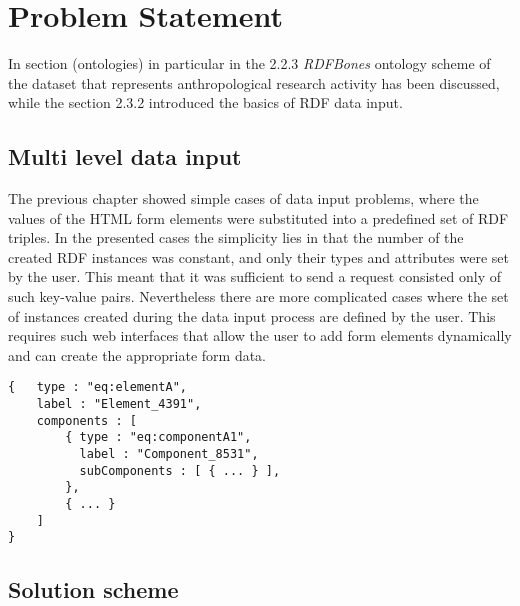 \chapter{Problem Statement}


In section (ontologies) in particular in the 2.2.3 \textit{RDFBones} ontology scheme of the dataset that represents anthropological research activity has been discussed, while the section 2.3.2 introduced the basics of RDF data input. 


\section{Multi level data input}


The previous chapter showed simple cases of data input problems, where the values of the HTML form elements were substituted into a predefined set of RDF triples. In the presented cases the simplicity lies in that the number of the created RDF instances was constant, and only their types and attributes were set by the user. This meant that it was sufficient to send a request consisted only of such key-value pairs. Nevertheless there are more complicated cases where the set of instances created during the data input process are defined by the user. This requires such web interfaces that allow the user to add form elements dynamically and can create the appropriate form data.









\begin{lstlisting}[basicstyle=\footnotesize, frame=single, caption={Multi level form data in JSON}, label=multiData, captionpos=b, belowskip=1em, aboveskip=2em]
{	type : "eq:elementA",
	label : "Element_4391",
	components : [
		{ type : "eq:componentA1",
		  label : "Component_8531",	
		  subComponents : [ { ... } ],
		},
		{ ... }
	]
}
\end{lstlisting}




\section{Solution scheme}

